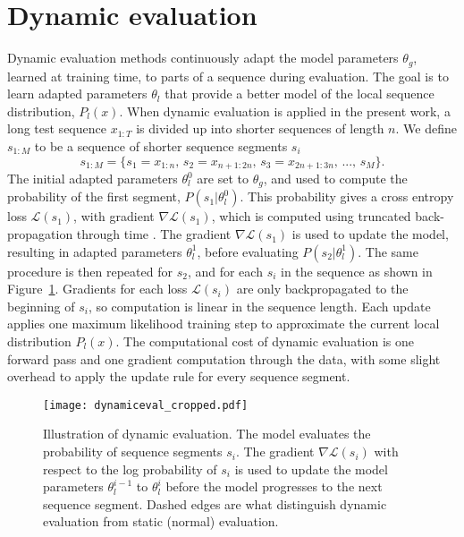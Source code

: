 \documentclass{article} \usepackage{iclr2018_conference,times}
\begin{document}
\section{Dynamic evaluation}
\label{sec:dyneval}

Dynamic evaluation methods continuously adapt the model parameters $\theta_g$, learned at training time, to parts of a sequence during evaluation. The goal is to learn adapted parameters $\theta_l$ that provide a better model of the local sequence distribution, $P_l(x)$. When dynamic evaluation is applied in the present work, a long test sequence $x_{1:T}$ is divided up into shorter sequences of length $n$. We define $s_{1:M}$ to be a sequence of shorter sequence segments $s_i$
\begin{equation}
\label{eq:seg}
s_{1:M} = \{s_1 \!=\! x_{1:n},\, s_2\!=\!x_{n+1:2n},\, s_3\!=\!x_{2n+1:3n},\, ...,\, s_M\}.
\end{equation}  
The initial adapted parameters $\theta^0_l$ are set to $\theta_g$, and used to compute the probability of the first segment, $P(s_1|\theta^0_l)$. This probability gives a cross entropy loss $\mathcal{L}(s_1)$, with gradient $\nabla\mathcal{L}(s_1)$, which is computed using truncated back-propagation through time \citep{werbos-1990}. The gradient $\nabla\mathcal{L}(s_1)$ is used to update the model, resulting in adapted parameters $\theta^1_l$, before evaluating $P(s_2|\theta^1_l)$. The same procedure is then repeated for $s_2$, and for each $s_i$ in the sequence as shown in Figure~\ref{fig:dynamiceval}. Gradients for each loss $\mathcal{L}(s_i)$ are only backpropagated to the beginning of $s_i$, so computation is linear in the sequence length. Each update applies one maximum likelihood training step to approximate the current local distribution $P_l(x)$. The computational cost of dynamic evaluation is one forward pass and one gradient computation through the data, with some slight overhead to apply the update rule for every sequence segment.



\begin{figure}[tb]
  \centering
  \texttt{[image: dynamiceval\_cropped.pdf]}
  \caption{Illustration of dynamic evaluation. The model evaluates the probability of sequence segments $s_i$. The gradient $\nabla\mathcal{L}(s_i)$ with respect to the log probability of $s_i$ is used to update the model parameters $\theta^{i-1}_l$ to $\theta^{i}_l$ before the model progresses to the next sequence segment. Dashed edges are what distinguish dynamic evaluation from static (normal) evaluation.  }
  \label{fig:dynamiceval}
\end{figure}
\end{document}
